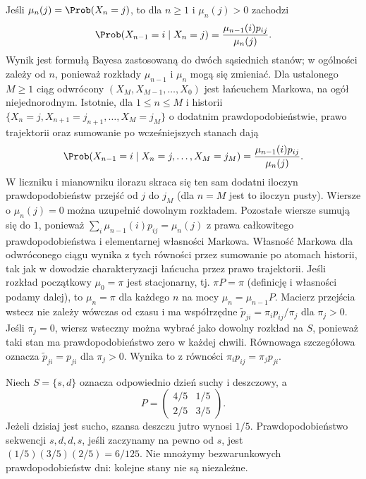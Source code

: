 \begin{uwaga}
Jeśli $\mu_n(j)=\Prob(X_n=j)$, to dla $n\geq1$
i $\mu_n(j)>0$ zachodzi
\[
\Prob(X_{n-1}=i\mid X_n=j)
=\frac{\mu_{n-1}(i)p_{ij}}{\mu_n(j)}.
\]
Wynik jest formułą Bayesa zastosowaną do dwóch
sąsiednich stanów; w ogólności zależy od $n$,
ponieważ rozkłady $\mu_{n-1}$ i $\mu_n$ mogą się zmieniać.
Dla ustalonego $M\geq1$ ciąg odwrócony
$(X_M,X_{M-1},\ldots,X_0)$ jest łańcuchem
Markowa, na ogół niejednorodnym. Istotnie,
dla $1\leq n\leq M$ i historii
$\{X_n=j,X_{n+1}=j_{n+1},\ldots,X_M=j_M\}$
o dodatnim prawdopodobieństwie, prawo trajektorii
oraz sumowanie po wcześniejszych stanach dają
\[
\Prob(X_{n-1}=i\mid X_n=j,\ldots,X_M=j_M)
=\frac{\mu_{n-1}(i)p_{ij}}{\mu_n(j)}.
\]
W liczniku i mianowniku ilorazu skraca się
ten sam dodatni iloczyn prawdopodobieństw przejść
od $j$ do $j_M$ (dla $n=M$ jest to iloczyn pusty).
Wiersze o $\mu_n(j)=0$ można uzupełnić dowolnym
rozkładem. Pozostałe wiersze sumują się do $1$,
ponieważ $\sum_i\mu_{n-1}(i)p_{ij}=\mu_n(j)$
z prawa całkowitego prawdopodobieństwa i elementarnej
własności Markowa.
Własność Markowa dla odwróconego ciągu wynika
z tych równości przez sumowanie po atomach
historii, tak jak w dowodzie charakteryzacji
łańcucha przez prawo trajektorii.
Jeśli rozkład początkowy $\mu_0=\pi$ jest stacjonarny,
tj. $\pi P=\pi$ (definicję i własności podamy dalej),
to $\mu_n=\pi$ dla każdego $n$ na mocy
$\mu_n=\mu_{n-1}P$. Macierz przejścia wstecz
nie zależy wówczas od czasu i ma współrzędne
$\widetilde p_{ji}=\pi_i p_{ij}/\pi_j$
dla $\pi_j>0$. Jeśli $\pi_j=0$, wiersz wsteczny
można wybrać jako dowolny rozkład na $S$, ponieważ
taki stan ma prawdopodobieństwo zero w każdej chwili.
Równowaga szczegółowa oznacza
$\widetilde p_{ji}=p_{ji}$ dla $\pi_j>0$.
Wynika to z równości $\pi_i p_{ij}=\pi_j p_{ji}$.
\end{uwaga}

\begin{przyklad}
Niech $S=\{s,d\}$ oznacza odpowiednio dzień suchy
i deszczowy, a
\[
P=\begin{pmatrix} 4/5&1/5\\ 2/5&3/5\end{pmatrix}.
\]
Jeżeli dzisiaj jest sucho, szansa deszczu jutro
wynosi $1/5$. Prawdopodobieństwo sekwencji
$s,d,d,s$, jeśli zaczynamy na pewno od $s$, jest
$(1/5)(3/5)(2/5)=6/125$. Nie mnożymy
bezwarunkowych prawdopodobieństw dni: kolejne stany
nie są niezależne.
\end{przyklad}



